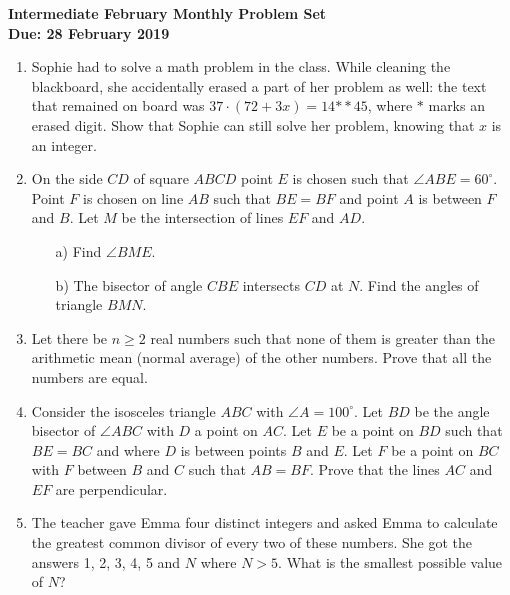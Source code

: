 \documentclass[a4paper,12pt,titlepage]{article}
\begin{document}
\begin{center}
\textbf{\Large Intermediate February Monthly Problem Set}
\\ \vspace{1em}
\textbf{\large Due: 28 February 2019}
\end{center}

\vspace{4pt}

\begin{enumerate}[1.]

\item %
Sophie had to solve a math problem in the class. While cleaning the blackboard, she accidentally erased a part of her problem as well: the text that remained on board was $37\cdot(72+3x)=14{**}45$, where $*$ marks an erased digit. Show that Sophie can still solve her problem, knowing that $x$ is an integer.


\item %
On the side $CD$ of square $ABCD$ point $E$ is chosen such that $\angle ABE = 60^{\circ}$. Point $F$ is chosen on line $AB$ such that $BE = BF$ and point $A$ is between $F$ and $B$. Let $M$ be the intersection of lines $EF$ and $AD$.
\begin{itemize}
\item [a)] Find $\angle BME$.
\item [b)] The bisector of angle $CBE$ intersects $CD$ at $N$. Find the angles of triangle $BMN$.
\end{itemize}


\item %
Let there be $n \geq 2$ real numbers such that none of them is greater than the arithmetic mean (normal average) of the other numbers. Prove that all the numbers are equal.


\item %
Consider the isosceles triangle $ABC$ with $\angle A = 100^{\circ}$. Let $BD$ be the angle bisector of $\angle ABC$ with $D$ a point on $AC$. Let $E$ be a point on $BD$ such that $BE=BC$ and where $D$ is between points $B$ and $E$. Let $F$ be a point on $BC$ with $F$ between $B$ and $C$ such that $AB=BF$. Prove that the lines $AC$ and $EF$ are perpendicular.


\item %
The teacher gave Emma four distinct integers and asked Emma to calculate the greatest common divisor of every two of these numbers. She got the answers 1, 2, 3, 4, 5 and $N$ where $N>5$. What is the smallest possible value of $N$?



\end{enumerate}
\end{document}
